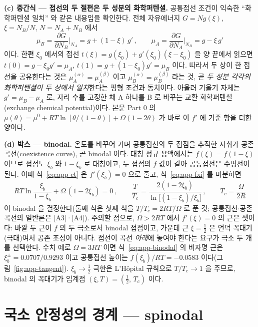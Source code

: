 \documentclass[11pt,a4paper]{article}
\begin{document}
\textbf{(c) 중간식 --- 접선의 두 절편은 두 성분의 화학퍼텐셜.} 공통접선 조건이 익숙한 ``화학퍼텐셜
일치'' 와 같은 내용임을 확인한다. 전체 자유에너지 $G=N g(\xi)$, $\xi=N_B/N$, $N=N_A+N_B$ 에서
\begin{equation}
\mu_B=\frac{\partial G}{\partial N_B}\Big|_{N_A}=g+(1-\xi)\,g'\,,\qquad
\mu_A=\frac{\partial G}{\partial N_A}\Big|_{N_B}=g-\xi\,g'
\label{eq:app-mus}
\end{equation}
이다. 한편 $\xi_0$ 에서의 접선 $t(\xi)=g(\xi_0)+g'(\xi_0)(\xi-\xi_0)$ 을 양 끝에서 읽으면
$t(0)=g-\xi_0 g'=\mu_A$, $t(1)=g+(1-\xi_0)g'=\mu_B$ 이다. 따라서 두 상이 한 접선을 공유한다는 것은
$\mu_A^{(\alpha)}=\mu_A^{(\beta)}$ 이고 $\mu_B^{(\alpha)}=\mu_B^{(\beta)}$ 라는 것, 곧 \emph{두 성분
각각의 화학퍼텐셜이 두 상에서 일치}한다는 평형 조건과 동치이다. 아울러 기울기 자체는
$g'=\mu_B-\mu_A$ 로, 자리 수를 고정한 채 A 하나를 B 로 바꾸는 교환 화학퍼텐셜(exchange chemical
potential)이다. 본문 Part 0 의 $\mu(\theta)=\mu^0+RT\ln[\theta/(1-\theta)]+\Omega(1-2\theta)$ 가
바로 이 $f'$ 에 기준 항을 더한 양이다.

\textbf{(d) 박스 --- binodal.} 온도를 바꾸어 가며 공통접선의 두 접점을 추적한 자취가 공존
곡선(coexistence curve), 곧 binodal 이다. 대칭 정규 용액에서는 $f(\xi)=f(1-\xi)$ 이므로 접점도
$\xi_b$ 와 $1-\xi_b$ 로 대칭이고, 두 접점의 $f$ 값이 같아 공통접선은 수평선이 된다. 이때
식~\eqref{eq:app-ct} 은 $f'(\xi_b)=0$ 으로 줄고, 식~\eqref{eq:app-fxi} 를 미분하면
\begin{equation}
\boxed{\;RT\ln\frac{\xi_b}{1-\xi_b}+\Omega\,(1-2\xi_b)=0\,,\qquad
\frac{T}{T_c}=\frac{2(1-2\xi_b)}{\ln\bigl[(1-\xi_b)/\xi_b\bigr]}\,,\qquad
T_c=\frac{\Omega}{2R}\;}
\label{eq:app-binodal}
\end{equation}
이 binodal 을 결정한다(둘째 식은 첫째 식을 $T/T_c=2RT/\Omega$ 로 푼 것; 공통접선$\cdot$공존 곡선의
일반론은 [A3]·[A4]). 주의할 점으로,
$\Omega>2RT$ 에서 $f'(\xi)=0$ 의 근은 셋이다: 바깥 두 근이 $f$ 의 두 극소로서 binodal 접점이고,
가운데 근 $\xi=\tfrac12$ 은 언덕 꼭대기(극대)여서 공존 조성이 아니다. 접선이 곡선 \emph{아래}에
놓여야 한다는 요구가 극소 두 개를 선택한다. 수치 예로 $\Omega=3RT$ 이면
식~\eqref{eq:app-binodal} 의 비자명 근은 $\xi_b^\pm=0.0707/0.9293$ 이고 공통접선 높이는
$f(\xi_b)/RT=-0.0583$ 이다(그림~\ref{fig:app-tangent}). $\xi_b\to\tfrac12$ 극한은 L'H\^opital
규칙으로 $T/T_c\to1$ 을 주므로, binodal 의 꼭대기가 임계점 $(\xi,T)=(\tfrac12,\,T_c)$ 이다.

\section{국소 안정성의 경계 --- spinodal}\label{app:spinodal}
\end{document}
